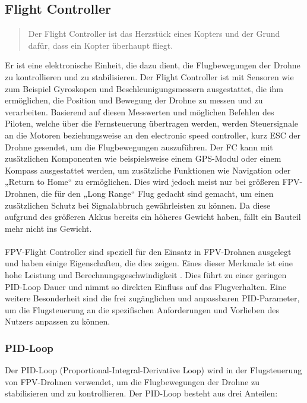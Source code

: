     \subsection[Flight Controller]{Flight Controller}
        \begin{quote}
            \glqq Der Flight Controller ist das Herzstück eines Kopters und der Grund dafür, dass ein Kopter
            überhaupt fliegt.\grqq~\cite{FCZitat}
        \end{quote}
        Er ist eine elektronische Einheit, die dazu dient, die Flugbewegungen der
        Drohne zu kontrollieren und zu stabilisieren. Der Flight Controller ist mit Sensoren wie zum
        Beispiel Gyroskopen und Beschleunigungsmessern ausgestattet, die ihm ermöglichen, die Position
        und Bewegung der Drohne zu messen und zu verarbeiten. Basierend auf diesen Messwerten und möglichen
        Befehlen des Piloten, welche über die Fernsteuerung übertragen werden, werden Steuersignale an
        die Motoren beziehungsweise an den electronic speed controller, kurz ESC der Drohne gesendet,
        um die Flugbewegungen auszuführen. Der FC kann mit zusätzlichen Komponenten wie beispielsweise
        einem GPS-Modul oder einem Kompass ausgestattet werden, um zusätzliche Funktionen wie Navigation
        oder „Return to Home“ zu ermöglichen. Dies wird jedoch meist nur bei größeren FPV-Drohnen, die
        für den „Long Range“ Flug gedacht sind gemacht, um einen zusätzlichen Schutz bei Signalabbruch
        gewährleisten zu können. Da diese aufgrund des größeren Akkus bereits ein höheres Gewicht haben,
        fällt ein Bauteil mehr nicht ins Gewicht. \\
        \\
        FPV-Flight Controller sind speziell für den Einsatz in FPV-Drohnen ausgelegt und haben einige
        Eigenschaften, die dies zeigen. Eines dieser Merkmale ist eine hohe Leistung und Berechnungsgeschwindigkeit
        \cite{CPUDatenblatt}. Dies führt zu einer geringen PID-Loop Dauer und nimmt so direkten Einfluss auf das
        Flugverhalten. Eine weitere Besonderheit sind die frei zugänglichen und anpassbaren PID-Parameter, um die
        Flugsteuerung an die spezifischen Anforderungen und Vorlieben des Nutzers anpassen zu können.
    
        \subsubsection[PID-Loop]{PID-Loop}
            Der PID-Loop (Proportional-Integral-Derivative Loop) wird in der Flugsteuerung von FPV-Drohnen verwendet, um die
            Flugbewegungen der Drohne zu stabilisieren und zu kontrollieren. Der PID-Loop besteht aus drei Anteilen:

